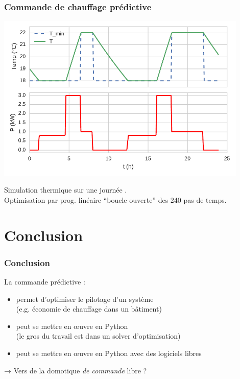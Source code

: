 \begin{frame}
  \frametitle{Commande de chauffage prédictive}

  \begin{center}
    \includegraphics[width=0.9\textwidth]{notebook/sim_linprog.pdf}
    
    \footnotesize
     Simulation thermique sur une journée .\\
     Optimisation par prog. linéaire ``boucle ouverte'' des 240 pas de temps.
  \end{center}
\end{frame}


\section{Conclusion}


\begin{frame}[c]
  \frametitle{Conclusion}
  
  \begin{block}{La commande prédictive :}
  \begin{itemize}
   \item permet d'optimiser le pilotage d'un système\\ (e.g. économie de chauffage dans un bâtiment)
   \item peut se mettre en œuvre en Python \\(le gros du travail est dans un solver d'optimisation)
   \item peut se mettre en œuvre en Python avec des logiciels libres
  \end{itemize}
  \end{block}
  
  \pause
  \begin{block}{}
   → Vers de la domotique \emph{de commande} libre ?
  \end{block}

\end{frame}


